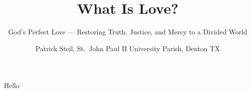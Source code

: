 \documentclass[
  american,
  twoside,
  openany]{book}
\title{What Is Love?}
\subtitle{God's Perfect Love --- Restoring Truth, Justice, and Mercy to
a Divided World}
\author{Patrick Steil, St.~John Paul II University Parish, Denton TX}
\date{}
\begin{document}
\frontmatter
\maketitle

\mainmatter
Hello

\backmatter
\end{document}
